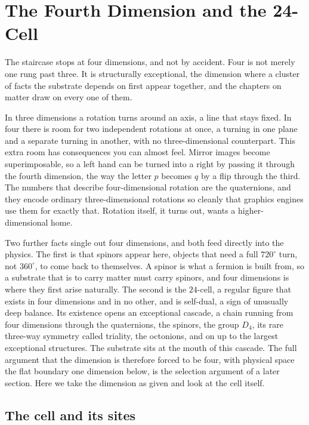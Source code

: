 \section{The Fourth Dimension and the 24-Cell}

The staircase stops at four dimensions, and not by accident. Four is not merely one rung past three. It is structurally exceptional, the dimension where a cluster of facts the substrate depends on first appear together, and the chapters on matter draw on every one of them.

In three dimensions a rotation turns around an axis, a line that stays fixed. In four there is room for two independent rotations at once, a turning in one plane and a separate turning in another, with no three-dimensional counterpart. This extra room has consequences you can almost feel. Mirror images become superimposable, so a left hand can be turned into a right by passing it through the fourth dimension, the way the letter $p$ becomes $q$ by a flip through the third. The numbers that describe four-dimensional rotation are the quaternions, and they encode ordinary three-dimensional rotations so cleanly that graphics engines use them for exactly that. Rotation itself, it turns out, wants a higher-dimensional home.

Two further facts single out four dimensions, and both feed directly into the physics. The first is that spinors appear here, objects that need a full $720^\circ$ turn, not $360^\circ$, to come back to themselves. A spinor is what a fermion is built from, so a substrate that is to carry matter must carry spinors, and four dimensions is where they first arise naturally. The second is the $24$-cell, a regular figure that exists in four dimensions and in no other, and is self-dual, a sign of unusually deep balance. Its existence opens an exceptional cascade, a chain running from four dimensions through the quaternions, the spinors, the group $D_4$, its rare three-way symmetry called triality, the octonions, and on up to the largest exceptional structures. The substrate sits at the mouth of this cascade. The full argument that the dimension is therefore forced to be four, with physical space the flat boundary one dimension below, is the selection argument of a later section. Here we take the dimension as given and look at the cell itself.

\subsection{The cell and its sites}

